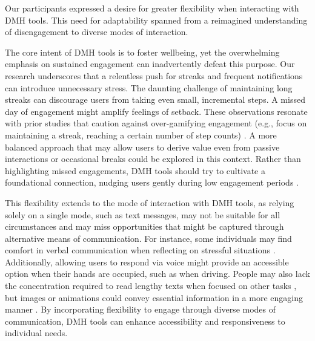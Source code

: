 Our participants expressed a desire for greater flexibility when interacting with DMH tools. This need for adaptability spanned from a reimagined understanding of disengagement to diverse modes of interaction.

The core intent of DMH tools is to foster wellbeing, yet the overwhelming emphasis on sustained engagement can inadvertently defeat this purpose. Our research underscores that a relentless push for streaks and frequent notifications can introduce unnecessary stress. The daunting challenge of maintaining long streaks can discourage users from taking even small, incremental steps. A missed day of engagement might amplify feelings of setback. These observations resonate with prior studies that caution against over-gamifying engagement (e.g., focus on maintaining a streak, reaching a certain number of step counts) \cite{etkin2016hidden, bekk2022all, liu2017toward, jia2016personality, hamari2014does}. A more balanced approach that may allow users to derive value even from passive interactions or occasional breaks could be explored in this context. Rather than highlighting missed engagements, DMH tools should try to cultivate a foundational connection, nudging users gently during low engagement periods \cite{bhattacharjee2023integrating}.

This flexibility extends to the mode of interaction with DMH tools, as relying solely on a single mode, such as text messages, may not be suitable for all circumstances and may miss opportunities that might be captured through alternative means of communication. For instance, some individuals may find comfort in verbal communication when reflecting on stressful situations \cite{murray1994emotional, stigall2022towards}. Additionally, allowing users to respond via voice might provide an accessible option when their hands are occupied, such as when driving. People may also lack the concentration required to read lengthy texts when focused on other tasks \cite{bhattacharjee2022kind}, but images or animations could convey essential information in a more engaging manner \cite{bryant2003imaginal, howe2022design}. By incorporating flexibility to engage through diverse modes of communication, DMH tools can enhance accessibility and responsiveness to individual needs.

